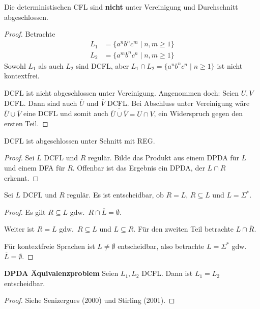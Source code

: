 \begin{Satz}
    Die deterministischen \ac{CFL} sind \textbf{nicht} unter Vereinigung und Durchschnitt abgeschlossen.
\end{Satz}
\begin{proof}
    Betrachte
    \begin{align*}
        L_1 &= \{ a^nb^nc^m \mid n, m \ge 1 \} \\
        L_2 &= \{ a^mb^nc^n \mid n, m \ge 1 \}
    \end{align*}
    Sowohl $L_1$ als auch $L_2$ sind DCFL, aber $L_1 \cap L_2 = \{ a^nb^nc^n \mid n \ge 1\}$ ist nicht kontextfrei.
    
    DCFL ist nicht abgeschlossen unter Vereinigung. Angenommen doch: Seien $U, V$ DCFL. Dann sind auch $\overline{U}$ und $\overline{V}$ DCFL. Bei Abschluss unter Vereinigung wäre $\overline{U} \cup \overline{V}$ eine DCFL und somit auch $\overline{\overline{U} \cup \overline{V}} = U \cap V$, ein Widerspruch gegen den ersten Teil.
\end{proof}
\begin{Satz}
    DCFL ist abgeschlossen unter Schnitt mit REG.
\end{Satz}
\begin{proof}
    Sei $L$ DCFL und $R$ regulär.
    Bilde das Produkt aus einem DPDA für $L$ und einem DFA für $R$.
    Offenbar ist das Ergebnis ein DPDA, der $L\cap R$ erkennt.
\end{proof}
\begin{Satz}
    Sei $L$ DCFL und $R$ regulär.
    Es ist entscheidbar, ob $R=L$, $R\subseteq L$ und $L=\Sigma^*$.
\end{Satz}
\begin{proof}
    Es gilt $R\subseteq L$ gdw.\ $R \cap \overline{L} = \emptyset$.
    
    Weiter ist $R = L$ gdw.\ $R\subseteq L$ und $L \subseteq R$. Für den zweiten Teil betrachte $L\cap \overline{R}$.
    
    Für kontextfreie Sprachen ist $L\ne \emptyset$ entscheidbar, also betrachte $L=\Sigma^*$ gdw.\ $\overline{L}=\emptyset$.
\end{proof}

\begin{Satz} \textbf{DPDA Äquivalenzproblem}
    Seien $L_1, L_2$ DCFL. Dann ist $L_1 = L_2$ entscheidbar.
\end{Satz}

\begin{proof}
    Siehe Senizergues (2000) und Stirling (2001).
\end{proof}

